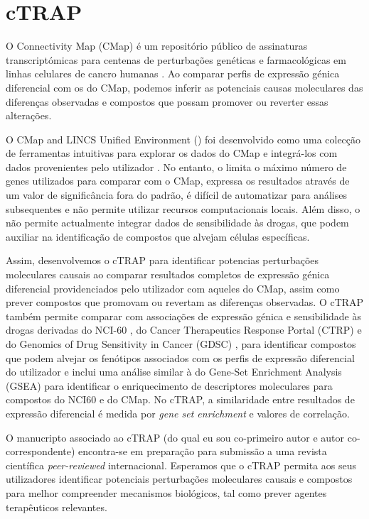 \section*{cTRAP}

O Connectivity Map (CMap) é um repositório público de assinaturas transcriptómicas para centenas de perturbações genéticas e farmacológicas em linhas celulares de cancro humanas \cite{subramanian:2017ul}. Ao comparar perfis de expressão génica diferencial com os do CMap, podemos inferir as potenciais causas moleculares das diferenças observadas e compostos que possam promover ou reverter essas alterações.

O CMap and LINCS Unified Environment () foi desenvolvido como uma colecção de ferramentas intuitivas para explorar os dados do CMap e integrá-los com dados provenientes pelo utilizador \cite{subramanian:2017ul}. No entanto, o  limita o máximo número de genes utilizados para comparar com o CMap, expressa os resultados através de um valor de significância fora do padrão, é difícil de automatizar para análises subsequentes e não permite utilizar recursos computacionais locais. Além disso, o  não permite actualmente integrar dados de sensibilidade às drogas, que podem auxiliar na identificação de compostos que alvejam células específicas.

Assim, desenvolvemos o cTRAP para identificar potencias perturbações moleculares causais ao comparar resultados completos de expressão génica diferencial providenciados pelo utilizador com aqueles do CMap, assim como prever compostos que promovam ou revertam as diferenças observadas. O cTRAP também permite comparar com associações de expressão génica e sensibilidade às drogas derivadas do NCI-60 \cite{shoemaker:2006wi}, do Cancer Therapeutics Response Portal (CTRP) \cite{seashore-ludlow:2015ws} e do Genomics of Drug Sensitivity in Cancer (GDSC) \cite{yang:2012vk}, para identificar compostos que podem alvejar os fenótipos associados com os perfis de expressão diferencial do utilizador e inclui uma análise similar à do Gene-Set Enrichment Analysis (GSEA) para identificar o enriquecimento de descriptores moleculares para compostos do NCI60 e do CMap. No cTRAP, a similaridade entre resultados de expressão diferencial é medida por \emph{gene set enrichment} \cite{subramanian:2017ul,subramanian:2005wu} e valores de correlação.

O manucripto associado ao cTRAP (do qual eu sou co-primeiro autor e autor co-correspondente) encontra-se em preparação para submissão a uma revista científica \emph{peer-reviewed} internacional. Esperamos que o cTRAP permita aos seus utilizadores identificar potenciais perturbações moleculares causais e compostos para melhor compreender mecanismos biológicos, tal como prever agentes terapêuticos relevantes.

